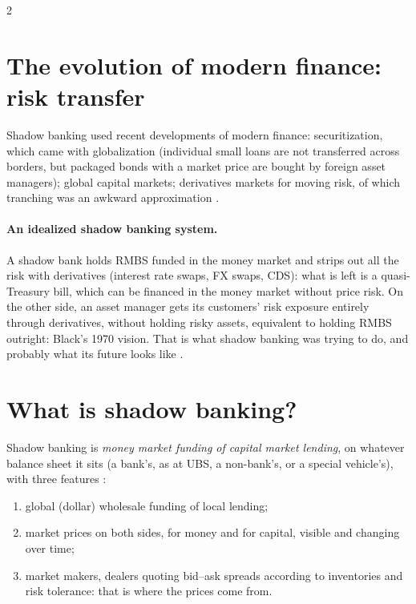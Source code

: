 \begin{paracol}{2}
\section{The evolution of modern finance: risk transfer}\label{sec:cbs-risk}

Shadow banking used recent developments of modern finance: securitization, which came with globalization (individual small loans are not transferred across borders,
but packaged bonds with a market price are bought by foreign asset managers); global capital markets; derivatives markets for moving risk, of which tranching was an
awkward approximation .

\paragraph{An idealized shadow banking system.} A shadow bank holds RMBS funded in the money market and strips out all the risk with derivatives (interest rate swaps, FX
swaps, CDS): what is left is a quasi-Treasury bill, which can be financed in the money market without price risk. On the other side, an asset manager gets its
customers' risk exposure entirely through derivatives, without holding risky assets, equivalent to holding RMBS outright: Black's 1970 vision. That is what shadow
banking was trying to do, and probably what its future looks like .

\section{What is shadow banking?}\label{sec:cbs-what}

\begin{definition}
Shadow banking is \emph{money market funding of capital market lending}, on whatever balance sheet it sits (a bank's, as at UBS, a non-bank's, or a special
vehicle's), with three features :
\begin{enumerate}
  \item global (dollar) wholesale funding of local lending;
  \item market prices on both sides, for money and for capital, visible and changing over time;
  \item market makers, dealers quoting bid--ask spreads according to inventories and risk tolerance: that is where the prices come from.
\end{enumerate}
\end{definition}


\end{paracol}
